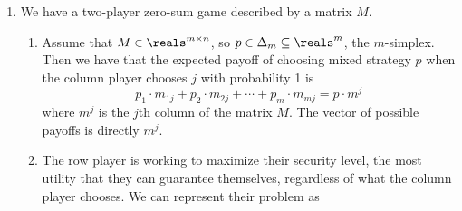 \documentclass[10pt]{article}
\begin{document}
\maketitle

\begin{enumerate}
	\item We have a two-player zero-sum game described by a matrix $M$. \begin{enumerate} \item Assume that $M \in \reals^{m \times n}$, so $p \in \Delta_m \subseteq \reals^m$, the $m$-simplex. Then we have that the expected payoff of choosing mixed strategy $p$ when the column player chooses $j$ with probability 1 is \[p_1 \cdot m_{1j} + p_2\cdot m_{2j} + \cdots + p_m \cdot m_{mj} = p \cdot m^{j}\]where $m^j$ is the $j$th column of the matrix $M$. The vector of possible payoffs is directly $m^j$. \item The row player is working to maximize their security level, the most utility that they can guarantee themselves, regardless of what the column player chooses. We can represent their problem as \begin{align*}

\end{align*}
\end{enumerate}
\end{enumerate}
\end{document}
